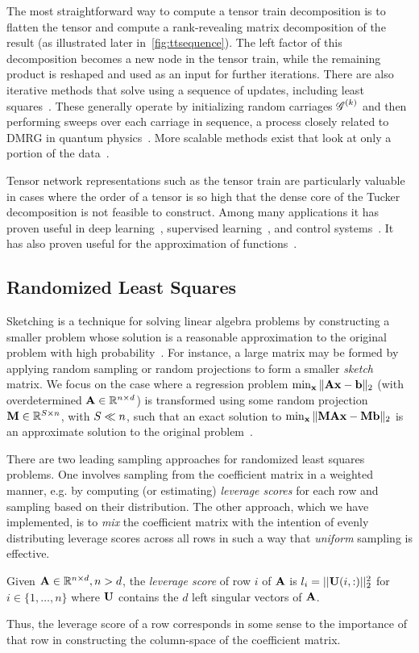 The most straightforward way to compute a tensor train decomposition is to flatten the tensor and compute a rank-revealing matrix decomposition of the result (as illustrated later in~\cref{fig:ttsequence}). The left factor of this decomposition becomes a new node in the tensor train, while the remaining product is reshaped and used as an input for further iterations. There are also iterative methods that solve using a sequence of updates, including least squares~\cite{dttals1,ttals}. These generally operate by initializing random carriages $\T{G}^{(k)}$ and then performing sweeps over each carriage in sequence, a process closely related to DMRG in quantum physics~\cite{dmrg}. More scalable methods exist that look at only a portion of the data~\cite{ttcross}. 

Tensor network representations such as the tensor train are particularly valuable in cases where the order of a tensor is so high that the dense core of the Tucker decomposition is not feasible to construct. Among many applications it has proven useful in deep learning~\cite{ttrnn,ttnn}, supervised learning~\cite{supervisedtt}, and control systems~\cite{ttcontrol}. It has also proven useful for the approximation of functions~\cite{GoKaMa15}.

\subsection{Randomized Least Squares}
\label{sec:sketching}
Sketching is a technique for solving linear algebra problems by constructing 
a smaller problem whose solution is a 
reasonable approximation to the original problem with high probability~\cite{sketching}. 
For instance, a large matrix may be formed by applying random sampling or random 
projections to form a smaller \emph{sketch} matrix. 
We focus on the case where a regression
problem $\min_{\V{x}}\| \M{A}\V{x} - \V{b} \|_2$ (with overdetermined
$\M{A} \in \mathbb{R}^{n\times d}$) is transformed using some random
projection $\M{M} \in \mathbb{R}^{\samplesize\times n}$, with $S\ll
n$, such that an exact solution to $\min_{\V{x}}\| \M{M}\M{A}\V{x} -
\M{M}\V{b} \|_2$ is an approximate solution to the original
problem~\cite{rokhlintygert,DrMaMuSa11,blendenpik}.


There are two leading sampling approaches for randomized least squares
problems. One involves sampling from the coefficient matrix in a
weighted manner, e.g. by computing (or estimating) \emph{leverage
  scores} for each row and sampling based on their distribution. The
other approach, which we have implemented, is to \emph{mix} the
coefficient matrix with the intention of evenly distributing leverage scores
across all rows in such a way that \emph{uniform} sampling is
effective. 
\begin{definition}
Given $\M{A} \in \mathbb{R}^{n\times d}, n > d$, the \emph{leverage score} of row $i$ of $\M{A}$ is $l_i = ||\M{U}(i,:)||_2^2$
for $i \in \{1,\dots ,n\}$ where $\M{U}$ contains the $d$ left singular vectors of $\M{A}$.
\end{definition}
Thus, the leverage score of a row corresponds in some sense to the
importance of that row in constructing the column-space of the
coefficient matrix. 


